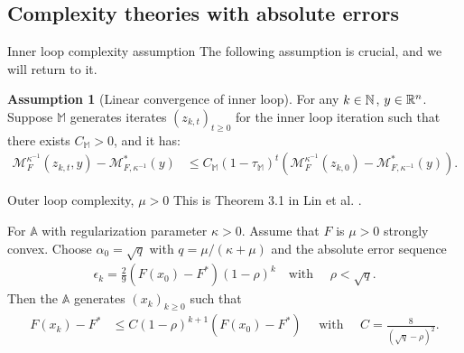 \documentclass[11pt]{beamer}
\theoremstyle{definition}
\newtheorem{assumption}{Assumption}[section]
\begin{document}
    \subsection{Complexity theories with absolute errors}
        \begin{frame}{Inner loop complexity assumption}
            The following assumption is crucial, and we will return to it. 
            \begin{assumption}[Linear convergence of inner loop]\label{ass:linear-convergence-inner-loop}
                For any $k \in \mathbb N$, $y \in \mathbb R^n$. 
                Suppose $\mathbb M$ generates iterates $(z_{k, t})_{t \ge 0}$ for the inner loop iteration such that there exists $C_{\mathbb M} > 0$, and it has: 
                {\small
                \begin{align*}
                    \mathcal M_F^{\kappa^{-1}}(z_{k, t}, y) - \mathcal M^*_{F, \kappa^{-1}}(y) 
                    &\le 
                    C_{\mathbb M}(1 - \tau_{\mathbb M})^t
                    \left(
                        \mathcal M_{F}^{\kappa^{-1}}(z_{k,0})
                        -
                        \mathcal M^*_{F, \kappa^{-1}}(y)
                    \right). 
                \end{align*}
                }
            \end{assumption}
        \end{frame}
        \begin{frame}{Outer loop complexity, $\mu > 0$}
            This is Theorem 3.1 in Lin et al. \cite{lin_universal_2015}. 
            \begin{theorem}[]\label{thm:err-seq-outer-s-cnvx}
            {\small
                For $\mathbb A$ with regularization parameter $\kappa > 0$. 
                Assume that $F$ is $\mu > 0$ strongly convex. 
                Choose $\alpha_0 = \sqrt{q}$ with $q = \mu/(\kappa + \mu)$ and the absolute error sequence 
                $$
                \begin{aligned}
                    \epsilon_k = \frac{2}{9}(F(x_0) - F^*)(1 - \rho)^k \quad \text{with }\quad 
                    \rho < \sqrt{q}. 
                \end{aligned}
                $$
                Then the $\mathbb A$ generates $(x_{k})_{k \ge 0}$ such that 
                $$
                \begin{aligned}
                    F(x_k) - F^* &\le 
                    C(1 - \rho)^{k + 1} (F(x_0) - F^*) \quad \text{ with }\quad 
                    C = \frac{8}{(\sqrt{q} - \rho)^2}. 
                \end{aligned}
                $$
            }
            \end{theorem}
        \end{frame}
\end{document}
